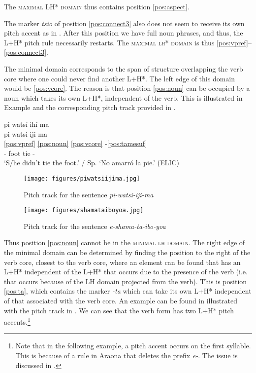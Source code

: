 \documentclass[output=paper,hidelinks]{langscibook}
\begin{document}
The \textsc{maximal LH* domain} thus contains position \ref{pos:aspect}.

The marker \textit{tsio} of position \ref{pos:connect3} also does not seem to receive its own pitch accent as in . After this position we have full noun phrases, and thus, the L+H* pitch rule necessarily restarts. The \textsc{maximal lh* domain} is thus \ref{pos:vpref}--\ref{pos:connect3}.

 The minimal domain corresponds to the span of structure overlapping the verb core where one could never find another L+H*. The left edge of this domain would be \ref{pos:vcore}. The reason is that position \ref{pos:noun} can be occupied by a noun which takes its own L+H*, independent of the verb. This is illustrated in Example  and the corresponding pitch track provided in .

\ea \label{ex:piwatsiijima}
	pi watsí ihí ma \downarrow \\	
	\glll pi watsi iji ma \\
    \ref{pos:vpref} \ref{pos:noun} \ref{pos:vcore} -\ref{pos:tamesuf}  \\
    \Neg{}- foot tie -\Neg{}  \\ 
	\glt `S/he didn't tie the foot.' / Sp. `No amarró la pie.' \hfill (ELIC)
\z

\begin{figure}[p]
    \texttt{[image: figures/piwatsiijima.jpg]}
    \caption{Pitch track for the sentence \textit{pi-watsi-iji-ma}}
    \label{fig:piwatsiijima}
\end{figure}

\begin{figure}[p]
    \texttt{[image: figures/shamataiboyoa.jpg]}
    \caption{Pitch track for the sentence \textit{e-shama-ta-ibo-yoa}}
    \label{fig:shamataiboyoa}
\end{figure}


Thus position \ref{pos:noun} cannot be in the \textsc{minimal lh domain}. The right edge of the minimal domain can be determined by finding the position to the right of the verb core, closest to the verb core, where an element can be found that has an L+H* independent of the L+H* that occurs due to the presence of the verb (i.e. that occurs because of the LH domain projected from the verb). This is position \ref{pos:ta}, which contains the marker \textit{-ta} which can take its own L+H* independent of that associated with the verb core. An example can be found in  illustrated with the pitch track in . We can see that the verb form has two L+H* pitch accents.\footnote{Note that in the following example, a pitch accent occurs on the first syllable. This is because of a rule in Araona that deletes the prefix \textit{e-}. The issue is discussed in .}
\end{document}
